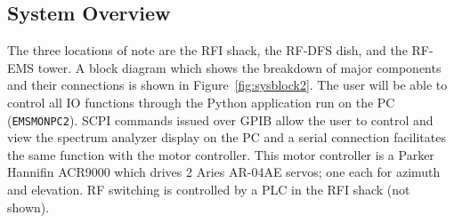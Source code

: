 \documentclass[titlepage]{article}
\begin{document}
\subsection{System Overview}
The three locations of note are the RFI shack, the RF-DFS dish, and the RF-EMS tower. A block diagram which shows the breakdown of major components and their connections is shown in Figure~\ref{fig:sysblock2}. The user will be able to control all IO functions through the Python application run on the PC (\verb|EMSMONPC2|).  SCPI commands issued over GPIB allow the user to control and view the spectrum analyzer display on the PC and a serial connection facilitates the same function with the motor controller. This motor controller is a Parker Hannifin ACR9000 which drives 2 Aries AR-04AE servos; one each for azimuth and elevation. RF switching is controlled by a PLC in the RFI shack (not shown).
\end{document}
